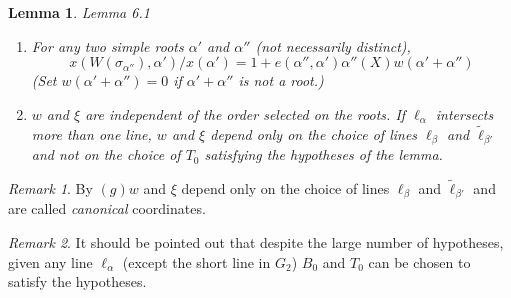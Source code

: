 \documentclass{memo-l}
\newtheorem{lemma}[theorem]{Lemma}
\theoremstyle{definition}
\theoremstyle{remark}
\newtheorem{rem}{Remark}
\numberwithin{section}{chapter}
\numberwithin{equation}{chapter}
\begin{document}
\begin{lemma}{Lemma 6.1}
\begin{enumerate}[label=\alph*)]
\item
For any two simple roots ${\alpha}'$ and ${\alpha}''$ (not necessarily
distinct), $$x(W({\sigma}_{{\alpha}''}),{\alpha}')/x({\alpha}') =
1+e({\alpha''},{\alpha}'){\alpha}''(X)w({\alpha}'+{\alpha}'')$$ (Set
$w({\alpha}'+{\alpha}'') = 0$ if ${\alpha}'+{\alpha}''$ is not a root.)

\item
$w$ and ${\xi}$ are independent of the order selected on the roots.  If
${\ell}_{{\alpha}}$ intersects more than one line, $w$ and ${\xi}$ depend
only on the choice of lines ${\ell}_{{\beta}}$ and $\tilde{\ell}
_{{\beta}'}$ and not on the choice of $T_{0}$ satisfying the hypotheses of
the lemma.
\end{enumerate}
\end{lemma}

\begin{rem}  %
By $(g) w$ and ${\xi}$ depend only on the choice of
lines ${\ell}_{{\beta}}$ and $\tilde{\ell} _{{\beta}'}$ and are called
{\it canonical} coordinates.
\end{rem}

\begin{rem} %
It should be pointed out that despite the large
number of hypotheses, given any line ${\ell}_{{\alpha}}$ (except the short
line in $G_{2}$) $B_{0}$ and $T_{0}$ can be chosen to satisfy the hypotheses.
\end{rem}
\end{document}
